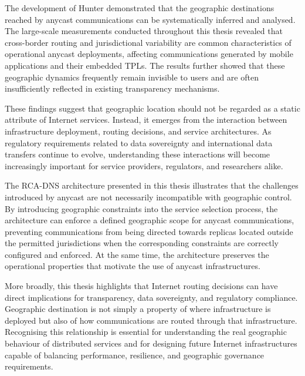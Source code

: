 The development of Hunter demonstrated that the geographic destinations reached by anycast communications can be systematically inferred and analysed. The large-scale measurements conducted throughout this thesis revealed that cross-border routing and jurisdictional variability are common characteristics of operational anycast deployments, affecting communications generated by mobile applications and their embedded TPLs. The results further showed that these geographic dynamics frequently remain invisible to users and are often insufficiently reflected in existing transparency mechanisms.

These findings suggest that geographic location should not be regarded as a static attribute of Internet services. Instead, it emerges from the interaction between infrastructure deployment, routing decisions, and service architectures. As regulatory requirements related to data sovereignty and international data transfers continue to evolve, understanding these interactions will become increasingly important for service providers, regulators, and researchers alike.

The RCA-DNS architecture presented in this thesis illustrates that the challenges introduced by anycast are not necessarily incompatible with geographic control. By introducing geographic constraints into the service selection process, the architecture can enforce a defined geographic scope for anycast communications, preventing communications from being directed towards replicas located outside the permitted jurisdictions when the corresponding constraints are correctly configured and enforced. At the same time, the architecture preserves the operational properties that motivate the use of anycast infrastructures.

More broadly, this thesis highlights that Internet routing decisions can have direct implications for transparency, data sovereignty, and regulatory compliance. Geographic destination is not simply a property of where infrastructure is deployed but also of how communications are routed through that infrastructure. Recognising this relationship is essential for understanding the real geographic behaviour of distributed services and for designing future Internet infrastructures capable of balancing performance, resilience, and geographic governance requirements.
